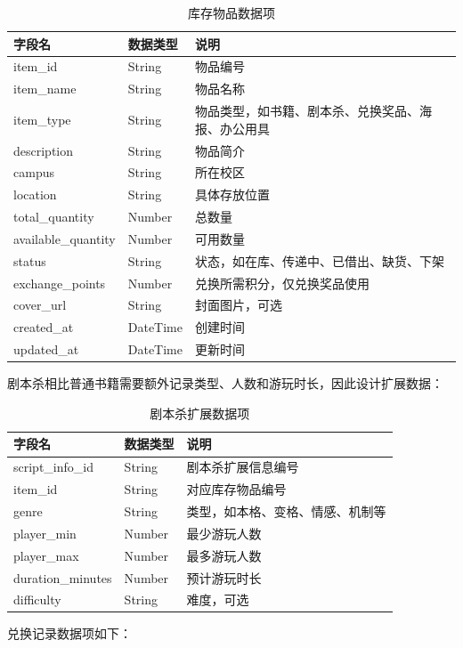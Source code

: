 \documentclass[a4paper,12pt]{article}
\begin{document}
\begin{longtable}{p{3.5cm}p{3cm}p{7cm}}
\caption{库存物品数据项} \\
\toprule
字段名 & 数据类型 & 说明 \\
\midrule
item\_id & String & 物品编号 \\
item\_name & String & 物品名称 \\
item\_type & String & 物品类型，如书籍、剧本杀、兑换奖品、海报、办公用具 \\
description & String & 物品简介 \\
campus & String & 所在校区 \\
location & String & 具体存放位置 \\
total\_quantity & Number & 总数量 \\
available\_quantity & Number & 可用数量 \\
status & String & 状态，如在库、传递中、已借出、缺货、下架 \\
exchange\_points & Number & 兑换所需积分，仅兑换奖品使用 \\
cover\_url & String & 封面图片，可选 \\
created\_at & DateTime & 创建时间 \\
updated\_at & DateTime & 更新时间 \\
\bottomrule
\end{longtable}

剧本杀相比普通书籍需要额外记录类型、人数和游玩时长，因此设计扩展数据：

\begin{longtable}{p{3.5cm}p{3cm}p{7cm}}
\caption{剧本杀扩展数据项} \\
\toprule
字段名 & 数据类型 & 说明 \\
\midrule
script\_info\_id & String & 剧本杀扩展信息编号 \\
item\_id & String & 对应库存物品编号 \\
genre & String & 类型，如本格、变格、情感、机制等 \\
player\_min & Number & 最少游玩人数 \\
player\_max & Number & 最多游玩人数 \\
duration\_minutes & Number & 预计游玩时长 \\
difficulty & String & 难度，可选 \\
\bottomrule
\end{longtable}

兑换记录数据项如下：
\end{document}

